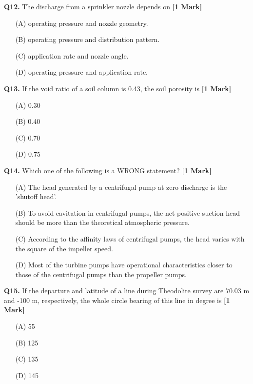 \documentclass[11pt]{article}
\newcommand{\questiona}[2]{
    \noindent\textbf{Q#2.} #1 \hfill \textbf{[1 Mark]}
}
\begin{document}
\questiona{The discharge from a sprinkler nozzle depends on}{12}
\begin{enumerate}
    \item[(A)] operating pressure and nozzle geometry.  
    \item[(B)] operating pressure and distribution pattern.  
    \item[(C)] application rate and nozzle angle.  
    \item[(D)] operating pressure and application rate.  
\end{enumerate}
\vspace{0.5cm}

\questiona{If the void ratio of a soil column is 0.43, the soil porosity is}{13}
\begin{enumerate}
    \item[(A)] 0.30  
    \item[(B)] 0.40  
    \item[(C)] 0.70  
    \item[(D)] 0.75  
\end{enumerate}
\vspace{0.5cm}

\questiona{Which one of the following is a WRONG statement?}{14}
\begin{enumerate}
    \item[(A)] The head generated by a centrifugal pump at zero discharge is the 'shutoff head'.  
    \item[(B)] To avoid cavitation in centrifugal pumps, the net positive suction head should be more than the theoretical atmospheric pressure.  
    \item[(C)] According to the affinity laws of centrifugal pumps, the head varies with the square of the impeller speed.  
    \item[(D)] Most of the turbine pumps have operational characteristics closer to those of the centrifugal pumps than the propeller pumps.  
\end{enumerate}
\vspace{0.5cm}

\questiona{If the departure and latitude of a line during Theodolite survey are 70.03 m and -100 m, respectively, the whole circle bearing of this line in degree is}{15}
\begin{enumerate}
    \item[(A)] 55  
    \item[(B)] 125  
    \item[(C)] 135  
    \item[(D)] 145  
\end{enumerate}
\vspace{0.5cm}
\end{document}
